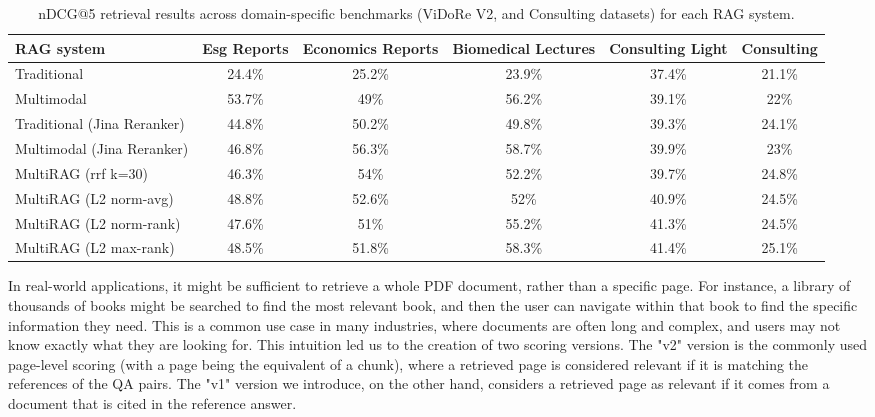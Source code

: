 \documentclass[12pt,twoside]{report}
\begin{document}
\begin{table}[tbhp]
  \centering
  \begingroup
  \footnotesize
  \setlength{\tabcolsep}{5pt}
  \renewcommand{\arraystretch}{1.25}
  \caption{nDCG@5 retrieval results across domain-specific benchmarks (ViDoRe V2, and Consulting datasets) for each RAG system.}
  \label{tab:dom_spec_results}

  \renewcommand{\tabularxcolumn}[1]{m{#1}}
  
  \begin{tabularx}{\textwidth}{| L | C | C | C | C | C |}
    \hline
    RAG system & Esg Reports & Economics Reports & Biomedical Lectures & Consulting Light & Consulting \\ \hline
    Traditional & 24.4\% & 25.2\% & 23.9\% & 37.4\% & 21.1\% \\ \hline
    Multimodal & 53.7\% & 49\% & 56.2\% & 39.1\% & 22\% \\ \hline \hline
    Traditional (Jina Reranker) & 44.8\% & 50.2\% & 49.8\% & 39.3\% & 24.1\% \\ \hline
    Multimodal (Jina Reranker) & 46.8\% & 56.3\% & 58.7\% & 39.9\% & 23\% \\ \hline \hline
    MultiRAG (rrf k=30) & 46.3\% & 54\% & 52.2\% & 39.7\% & 24.8\% \\ \hline
    MultiRAG (L2 norm-avg) & 48.8\% & 52.6\% & 52\% & 40.9\% & 24.5\% \\ \hline
    MultiRAG (L2 norm-rank) & 47.6\% & 51\% & 55.2\% & 41.3\% & 24.5\% \\ \hline
    MultiRAG (L2 max-rank) & 48.5\% & 51.8\% & 58.3\% & 41.4\% & 25.1\% \\ \hline
  \end{tabularx}
  \endgroup
\end{table}

In real-world applications, it might be sufficient to retrieve a whole PDF document, rather than a specific page. For instance, a library of thousands of books might be searched to find the most relevant book, and then the user can navigate within that book to find the specific information they need. This is a common use case in many industries, where documents are often long and complex, and users may not know exactly what they are looking for. This intuition led us to the creation of two scoring versions. The "v2" version is the commonly used page-level scoring (with a page being the equivalent of a chunk), where a retrieved page is considered relevant if it is matching the references of the QA pairs. The "v1" version we introduce, on the other hand, considers a retrieved page as relevant if it comes from a document that is cited in the reference answer.
\end{document}

